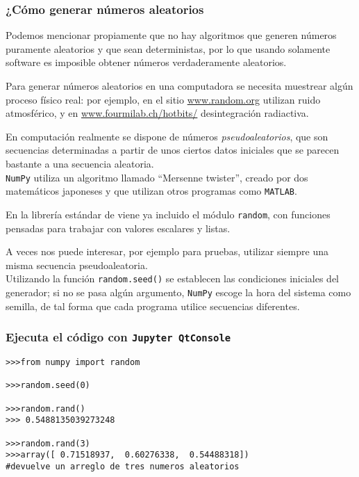 \begin{frame}
\frametitle{¿Cómo generar números aleatorios}
Podemos mencionar propiamente que no hay algoritmos que generen números puramente aleatorios y que sean deterministas, por lo que usando solamente software es imposible obtener números verdaderamente aleatorios.
\end{frame}
\begin{frame}
Para generar números aleatorios en una computadora se necesita muestrear algún proceso físico real: por ejemplo, en el sitio \url{www.random.org} utilizan ruido atmosférico, y en \url{www.fourmilab.ch/hotbits/} desintegración radiactiva.
\end{frame}
\begin{frame}
En computación realmente se dispone de números \emph{pseudoaleatorios}, que son secuencias determinadas a partir de unos ciertos datos iniciales que se parecen bastante a una secuencia aleatoria.
\\
\bigskip
\texttt{NumPy} utiliza un algoritmo llamado \enquote{Mersenne twister}, creado por dos matemáticos japoneses y que utilizan otros programas como \texttt{MATLAB}.
\end{frame}
\begin{frame}
En la librería estándar de \python viene ya incluido el módulo \texttt{random}, con funciones pensadas para trabajar con valores escalares y listas.
\end{frame}
\begin{frame}
A veces nos puede interesar, por ejemplo para pruebas, utilizar siempre una misma secuencia pseudoaleatoria.
\\
\bigskip
Utilizando la función \texttt{random.seed()} se establecen las condiciones iniciales del generador; si no se pasa algún argumento, \texttt{NumPy} escoge la hora del sistema como semilla, de tal forma que cada programa utilice secuencias diferentes.
\end{frame}
\begin{frame}[fragile]
\frametitle{Ejecuta el código con \texttt{Jupyter QtConsole}}
\begin{lstlisting}[basicstyle=\linespread{0.9}\ttfamily\normalsize, columns=fullflexible]
>>>from numpy import random

>>>random.seed(0)

>>>random.rand()
>>> 0.5488135039273248

>>>random.rand(3)
>>>array([ 0.71518937,  0.60276338,  0.54488318])
#devuelve un arreglo de tres numeros aleatorios
\end{lstlisting}
\end{frame}
